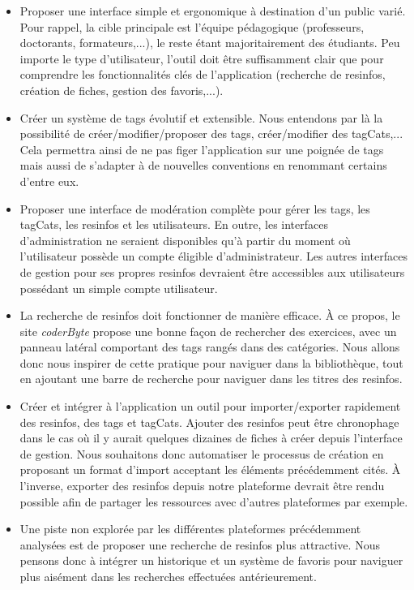 \begin{itemize}
    \item Proposer une interface simple et ergonomique à destination d'un public varié. Pour rappel, la cible principale est l'équipe pédagogique (professeurs, doctorants, formateurs,...), le reste étant majoritairement des étudiants. Peu importe le type d'utilisateur, l'outil doit être suffisamment clair que pour comprendre les fonctionnalités clés de l'application (recherche de \glspl{resinfo}, création de \glspl{fiche}, gestion des favoris,...).
    \item Créer un système de \glspl{tag} évolutif et extensible. Nous entendons par là la possibilité de créer/modifier/proposer des \glspl{tag}, créer/modifier des \glspl{tagCat},... Cela permettra ainsi de ne pas figer l'application sur une poignée de \glspl{tag} mais aussi de s'adapter à de nouvelles conventions en renommant certains d'entre eux.
    \item Proposer une interface de modération complète pour gérer les \glspl{tag}, les \glspl{tagCat}, les \glspl{resinfo} et les utilisateurs. En outre, les interfaces d'administration ne seraient disponibles qu'à partir du moment où l'utilisateur possède un compte éligible d'administrateur. Les autres interfaces de gestion pour ses propres \glspl{resinfo} devraient être accessibles aux utilisateurs possédant un simple compte utilisateur.
    \item La recherche de \glspl{resinfo} doit fonctionner de manière efficace. À ce propos, le site \textit{coderByte} propose une bonne façon de rechercher des exercices, avec un panneau latéral comportant des \glspl{tag} rangés dans des catégories. Nous allons donc nous inspirer de cette pratique pour naviguer dans la bibliothèque, tout en ajoutant une barre de recherche pour naviguer dans les titres des \glspl{resinfo}.
    \item Créer et intégrer à l'application un outil pour importer/exporter rapidement des \glspl{resinfo}, des \glspl{tag} et \glspl{tagCat}. Ajouter des \glspl{resinfo} peut être chronophage dans le cas où il y aurait quelques dizaines de \glspl{fiche} à créer depuis l'interface de gestion. Nous souhaitons donc automatiser le processus de création en proposant un format d'import acceptant les éléments précédemment cités. À l'inverse, exporter des \glspl{resinfo} depuis notre plateforme devrait être rendu possible afin de partager les ressources avec d'autres plateformes par exemple.
    \item Une piste non explorée par les différentes plateformes précédemment analysées est de proposer une recherche de \glspl{resinfo} plus attractive. Nous pensons donc à intégrer un historique et un système de favoris pour naviguer plus aisément dans les recherches effectuées antérieurement.
\end{itemize}

